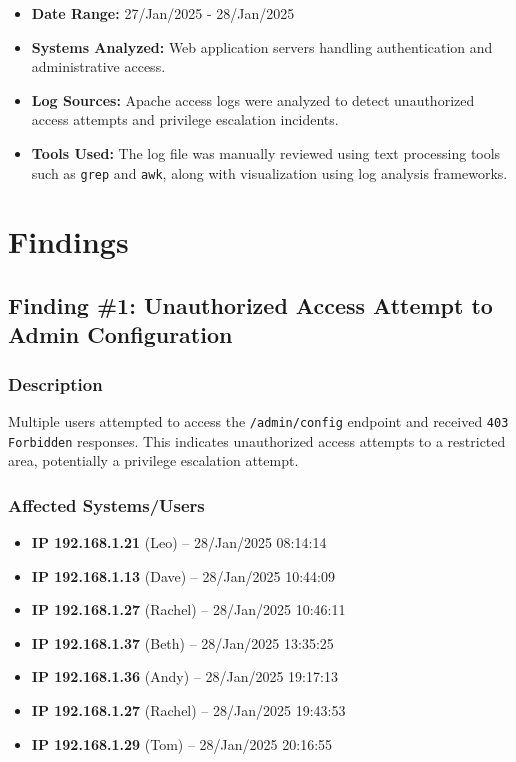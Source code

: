 \documentclass[11pt]{article}
\begin{document}
\begin{itemize}
    \item \textbf{Date Range:} 27/Jan/2025 - 28/Jan/2025

    \item \textbf{Systems Analyzed:}  
    Web application servers handling authentication and administrative access.

    \item \textbf{Log Sources:}  
    Apache access logs were analyzed to detect unauthorized access attempts and privilege escalation incidents.

    \item \textbf{Tools Used:}  
    The log file was manually reviewed using text processing tools such as \texttt{grep} and \texttt{awk}, along with visualization using log analysis frameworks.
\end{itemize}


\section{Findings}

\subsection{Finding \#1: Unauthorized Access Attempt to Admin Configuration}

\subsubsection{Description}
Multiple users attempted to access the \texttt{/admin/config} endpoint and received \texttt{403 Forbidden} responses. This indicates unauthorized access attempts to a restricted area, potentially a privilege escalation attempt.

\subsubsection{Affected Systems/Users}
\begin{itemize}
    \item \textbf{IP 192.168.1.21} (Leo) – 28/Jan/2025 08:14:14
    \item \textbf{IP 192.168.1.13} (Dave) – 28/Jan/2025 10:44:09
    \item \textbf{IP 192.168.1.27} (Rachel) – 28/Jan/2025 10:46:11
    \item \textbf{IP 192.168.1.37} (Beth) – 28/Jan/2025 13:35:25
    \item \textbf{IP 192.168.1.36} (Andy) – 28/Jan/2025 19:17:13
    \item \textbf{IP 192.168.1.27} (Rachel) – 28/Jan/2025 19:43:53
    \item \textbf{IP 192.168.1.29} (Tom) – 28/Jan/2025 20:16:55
\end{itemize}
\end{document}
